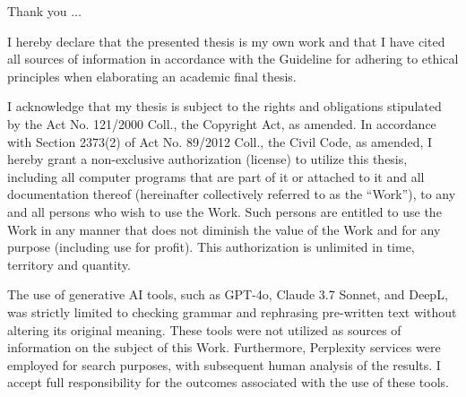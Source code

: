 \documentclass[english,bachelor,unicode,oneside]{ctufit-thesis}
\begin{document}
\frontmatter\frontmatterinit

\thispagestyle{empty}\maketitle\thispagestyle{empty}\cleardoublepage



\imprintpage
\stopTOCentries

\begin{acknowledgmentpage}
	Thank you \(\dots\)
\end{acknowledgmentpage}

\begin{declarationpage}
  I hereby declare that the presented thesis is my own work and that I have cited all sources of information in accordance with the Guideline for adhering to ethical principles when elaborating an academic final thesis.

  I acknowledge that my thesis is subject to the rights and obligations stipulated by the Act No. 121/2000 Coll., the Copyright Act, as amended. In accordance with Section 2373(2) of Act No. 89/2012 Coll., the Civil Code, as amended, I hereby grant a non-exclusive authorization (license) to utilize this thesis, including all computer programs that are part of it or attached to it and all documentation thereof (hereinafter collectively referred to as the ``Work''), to any and all persons who wish to use the Work. Such persons are entitled to use the Work in any manner that does not diminish the value of the Work and for any purpose (including use for profit). This authorization is unlimited in time, territory and quantity.

  The use of generative AI tools, such as GPT-4o, Claude 3.7 Sonnet, and DeepL, was strictly limited to checking grammar and rephrasing pre-written text without altering its original meaning. These tools were not utilized as sources of information on the subject of this Work. Furthermore, Perplexity services were employed for search purposes, with subsequent human analysis of the results. I accept full responsibility for the outcomes associated with the use of these tools.
\end{declarationpage}
\end{document}
